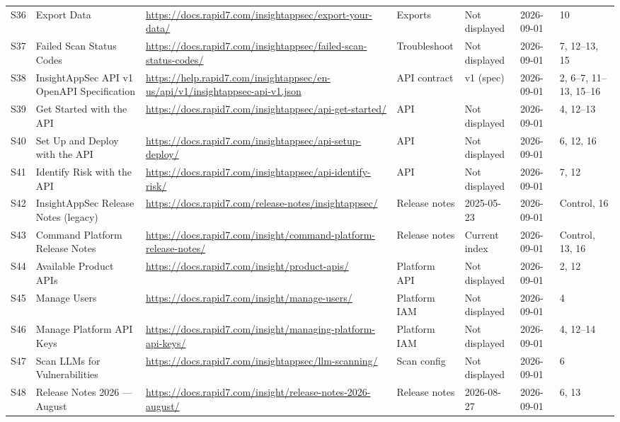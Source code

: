 \documentclass[11pt,letterpaper,oneside]{scrreprt}
\begin{document}
\begin{landscape}
\begin{longtable}{@{}P{0.34in}P{1.40in}P{3.00in}P{0.95in}P{0.75in}P{0.72in}P{1.55in}@{}}
\label{src:S36}S36 & Export Data & \url{https://docs.rapid7.com/insightappsec/export-your-data/} & Exports & Not displayed & 2026-09-01 & 10\\
\label{src:S37}S37 & Failed Scan Status Codes & \url{https://docs.rapid7.com/insightappsec/failed-scan-status-codes/} & Troubleshoot & Not displayed & 2026-09-01 & 7, 12--13, 15\\
\label{src:S38}S38 & InsightAppSec API v1 OpenAPI Specification & \url{https://help.rapid7.com/insightappsec/en-us/api/v1/insightappsec-api-v1.json} & API contract & v1 (spec) & 2026-09-01 & 2, 6--7, 11--13, 15--16\\
\label{src:S39}S39 & Get Started with the API & \url{https://docs.rapid7.com/insightappsec/api-get-started/} & API & Not displayed & 2026-09-01 & 4, 12--13\\
\label{src:S40}S40 & Set Up and Deploy with the API & \url{https://docs.rapid7.com/insightappsec/api-setup-deploy/} & API & Not displayed & 2026-09-01 & 6, 12, 16\\
\label{src:S41}S41 & Identify Risk with the API & \url{https://docs.rapid7.com/insightappsec/api-identify-risk/} & API & Not displayed & 2026-09-01 & 7, 12\\
\label{src:S42}S42 & InsightAppSec Release Notes (legacy) & \url{https://docs.rapid7.com/release-notes/insightappsec/} & Release notes & 2025-05-23 & 2026-09-01 & Control, 16\\
\label{src:S43}S43 & Command Platform Release Notes & \url{https://docs.rapid7.com/insight/command-platform-release-notes/} & Release notes & Current index & 2026-09-01 & Control, 13, 16\\
\label{src:S44}S44 & Available Product APIs & \url{https://docs.rapid7.com/insight/product-apis/} & Platform API & Not displayed & 2026-09-01 & 2, 12\\
\label{src:S45}S45 & Manage Users & \url{https://docs.rapid7.com/insight/manage-users/} & Platform IAM & Not displayed & 2026-09-01 & 4\\
\label{src:S46}S46 & Manage Platform API Keys & \url{https://docs.rapid7.com/insight/managing-platform-api-keys/} & Platform IAM & Not displayed & 2026-09-01 & 4, 12--14\\
\label{src:S47}S47 & Scan LLMs for Vulnerabilities & \url{https://docs.rapid7.com/insightappsec/llm-scanning/} & Scan config & Not displayed & 2026-09-01 & 6\\
\label{src:S48}S48 & Release Notes 2026 --- August & \url{https://docs.rapid7.com/insight/release-notes-2026-august/} & Release notes & 2026-08-27 & 2026-09-01 & 6, 13\\

\end{longtable}
\end{landscape}
\end{document}
